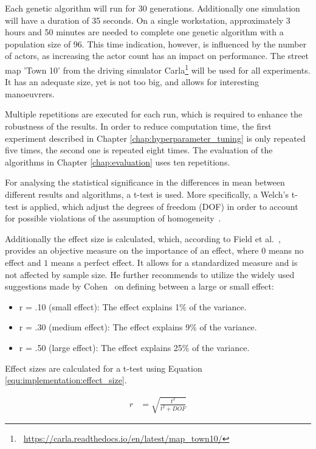 Each genetic algorithm will run for 30 generations. Additionally one simulation will have a duration of 35 seconds. On a single workstation, approximately 3 hours and 50 minutes are needed to complete one genetic algorithm with a population size of 96. This time indication, however, is influenced by the number of actors, as increasing the actor count has an impact on performance. The street map 'Town 10' from the driving simulator Carla\footnote{~\href{https://carla.readthedocs.io/en/latest/map_town10/}{https://carla.readthedocs.io/en/latest/map\_town10/}} will be used for all experiments. It has an adequate size, yet is not too big, and allows for interesting manoeuvrers.

Multiple repetitions are executed for each run, which is required to enhance the robustness of the results. In order to reduce computation time, the first experiment described in Chapter \ref{chap:hyperparameter_tuning} is only repeated five times, the second one is repeated eight times. The evaluation of the algorithms in Chapter \ref{chap:evaluation} uses ten repetitions.

For analysing the statistical significance in the differences in mean between different results and algorithms, a t-test is used. More specifically, a Welch's t-test is applied, which adjust the degrees of freedom (DOF) in order to account for possible violations of the assumption of homogeneity~\cite{field_discovering_2012}.

Additionally the effect size is calculated, which, according to Field et al.~\cite{field_discovering_2012}, provides an objective measure on the importance of an effect, where $0$ means no effect and $1$ means a perfect effect. It allows for a standardized measure and is not affected by sample size. He further recommends to utilize the widely used suggestions made by Cohen~\cite{cohen_statistical_1988, cohen_power_1992} on defining between a large or small effect:

\begin{itemize}
	\item r = .10 (small effect): The effect explains 1\% of the variance. 
	\item r = .30 (medium effect): The effect explains 9\% of the variance. 
	\item r = .50 (large effect): The effect explains 25\% of the variance.
\end{itemize} 

Effect sizes are calculated for a t-test using Equation \ref{equ:implementation:effect_size}.

\begin{equation}
	\begin{split}
		r & = \sqrt{\frac{t^2}{t^2 + DOF}}
	\end{split}
	\label{equ:implementation:effect_size}
\end{equation}


